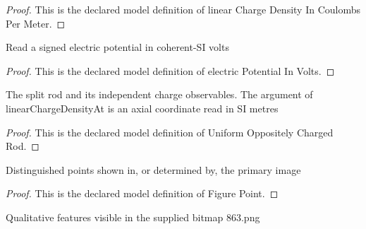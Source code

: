 \begin{proof}
  This is the declared model definition of linear Charge Density In Coulombs Per Meter.
\end{proof}
\begin{definition}
  \label{def:physics:phyx-mini-0863:phyxminiproblems-problemphyxmini0863-electricpotentialinvolts}
  Read a signed electric potential in coherent-SI volts
\end{definition}
\begin{proof}
  This is the declared model definition of electric Potential In Volts.
\end{proof}
\begin{definition}
  \label{def:physics:phyx-mini-0863:phyxminiproblems-problemphyxmini0863-uniformoppositelychargedrod}
  The split rod and its independent charge observables. The argument of linearChargeDensityAt is an axial coordinate read in SI metres
\end{definition}
\begin{proof}
  This is the declared model definition of Uniform Oppositely Charged Rod.
\end{proof}
\begin{definition}
  \label{def:physics:phyx-mini-0863:phyxminiproblems-problemphyxmini0863-figurepoint}
  Distinguished points shown in, or determined by, the primary image
\end{definition}
\begin{proof}
  This is the declared model definition of Figure Point.
\end{proof}
\begin{definition}
  \label{def:physics:phyx-mini-0863:phyxminiproblems-problemphyxmini0863-figurefeature}
  Qualitative features visible in the supplied bitmap 863.png
\end{definition}
